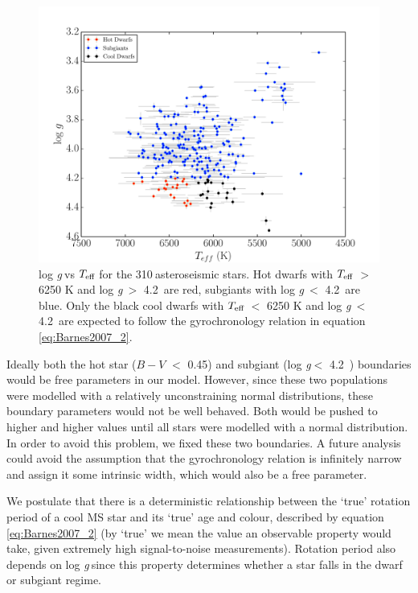 \documentclass[useAMS, usenatbib]{mn2e}
\newcommand{\logg}{log \emph{g}}
\newcommand{\teff}{$T_{\rm{eff}}$}
\newcommand{\nastero}{310}
\newcommand{\subcut}{4.2~}
\begin{document}
\begin{figure}
\begin{center}
\includegraphics[width=6in, clip=true, trim=0 0 0.5in 0]{logg_vs_t_paper.pdf}
\caption{\logg$~$vs \teff$~$for the \nastero$~$asteroseismic stars. Hot dwarfs
with \teff$~>$ 6250 K and \logg$~>$ \subcut are red, subgiants with \logg$~<$
\subcut are blue. Only the black cool dwarfs with \teff$~<$ 6250 K and
\logg$~<$ \subcut are expected to follow the gyrochronology relation in
equation \ref{eq:Barnes2007_2}.
\label{fig:logg_vs_t}}
\end{center}
\end{figure}

Ideally both the hot star ($B-V$ $<$ 0.45) and subgiant (\logg $<$ \subcut)
boundaries would be free parameters in our model.
However, since these two populations were modelled with a relatively
unconstraining normal distributions, these boundary parameters would not be
well behaved.
Both would be pushed to higher and higher values until all stars were modelled
with a normal distribution.
In order to avoid this problem, we fixed these two boundaries.
A future analysis could avoid the assumption that the gyrochronology relation
is infinitely narrow and assign it some intrinsic width, which would also be
a free parameter.

We postulate that there is a deterministic relationship between the `true'
rotation period of a cool MS star and its `true' age and colour, described by
equation \ref{eq:Barnes2007_2} (by `true' we mean the value an observable
property would take, given extremely high signal-to-noise measurements).
Rotation period also depends on \logg$~$since this property determines whether
a star falls in the dwarf or subgiant regime.
\end{document}
